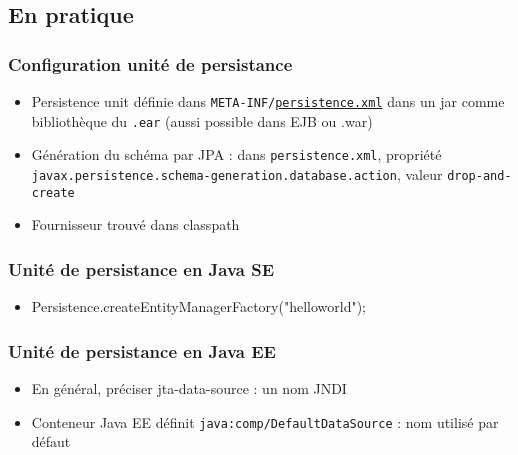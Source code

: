 \documentclass[english, french]{beamer}
\begin{document}
\subsection{En pratique}
\begin{frame}
	\frametitle{Configuration unité de persistance}
	\begin{itemize}
		\item Persistence unit définie dans \texttt{META-INF/\href{http://xmlns.jcp.org/xml/ns/persistence/persistence_2_1.xsd}{persistence.xml}} dans un jar comme bibliothèque du \texttt{.ear} {\tiny (aussi possible dans EJB ou .war)}
		\item Génération du schéma par JPA : dans \texttt{persistence.xml}, propriété \texttt{javax.persistence.schema-generation.database.action}, valeur \texttt{drop-and-create}
		\item Fournisseur trouvé dans classpath
	\end{itemize}
\end{frame}

\begin{frame}
	\frametitle{Unité de persistance en Java SE}
	\begin{itemize}
		\item Persistence.createEntityManagerFactory("helloworld");
	\end{itemize}
\end{frame}

\begin{frame}
	\frametitle{Unité de persistance en Java EE}
	\begin{itemize}
		\item En général, préciser jta-data-source : un nom JNDI
		\item Conteneur Java EE définit \texttt{java:comp/DefaultDataSource} : nom utilisé par défaut
	\end{itemize}
\end{frame}

\end{document}
